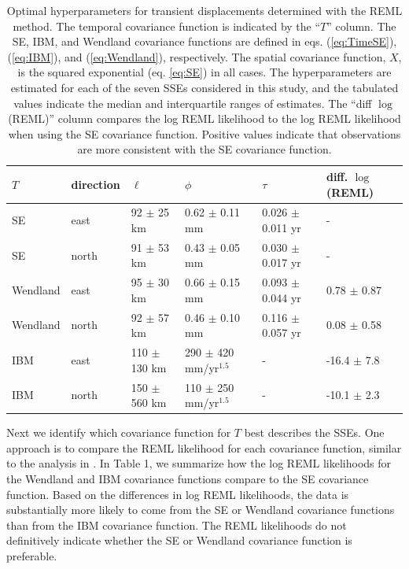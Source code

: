 \documentclass[10pt,letter]{article}
\begin{document}
\begin{table}\label{tab:Parameters}
\begin{tabular} {l l l l l l}
$T$ & direction & $\ell$  & $\phi$   & $\tau$  & diff. $\log$(REML) \\ \hline
SE & east   & 92 $\pm$ 25 km  & 0.62 $\pm$ 0.11 mm  & 0.026 $\pm$ 0.011 yr  &  - \\
SE & north  & 91 $\pm$ 53 km  & 0.43 $\pm$ 0.05 mm  & 0.030 $\pm$ 0.017 yr  &  - \\
Wendland & east   & 95 $\pm$ 30 km  & 0.66 $\pm$ 0.15 mm  & 0.093 $\pm$ 0.044 yr &  0.78 $\pm$ 0.87 \\
Wendland & north  & 92 $\pm$ 57 km  & 0.46 $\pm$ 0.10 mm  & 0.116 $\pm$ 0.057 yr &  0.08 $\pm$ 0.58 \\
IBM & east   & 110 $\pm$ 130 km & 290 $\pm$ 420 mm/yr$^{1.5}$  & -          & -16.4 $\pm$ 7.8 \\
IBM & north  & 150 $\pm$ 560 km & 110 $\pm$ 250 mm/yr$^{1.5}$ & -           & -10.1 $\pm$ 2.3 \\
\end{tabular}
\caption{Optimal hyperparameters for transient displacements determined with the REML method. The temporal covariance function is indicated by the ``$T$'' column. The SE, IBM, and Wendland covariance functions are defined in eqs. (\ref{eq:TimeSE}), (\ref{eq:IBM}), and (\ref{eq:Wendland}), respectively. The spatial covariance function, $X$, is the squared exponential (eq. \ref{eq:SE}) in all cases. The hyperparameters are estimated for each of the seven SSEs considered in this study, and the tabulated values indicate the median and interquartile ranges of estimates. The ``diff $\log$(REML)'' column compares the log REML likelihood to the log REML likelihood when using the SE covariance function. Positive values indicate that observations are more consistent with the SE covariance function.} 
\end{table}

Next we identify which covariance function for $T$ best describes the SSEs. One approach is to compare the REML likelihood for each covariance function, similar to the analysis in \citet{Langbein2004}. In Table 1, we summarize how the log REML likelihoods for the Wendland and IBM covariance functions compare to the SE covariance function.  Based on the differences in log REML likelihoods, the data is substantially more likely to come from the SE or Wendland covariance functions than from the IBM covariance function. The REML likelihoods do not definitively indicate whether the SE or Wendland covariance function is preferable. 
\end{document}
